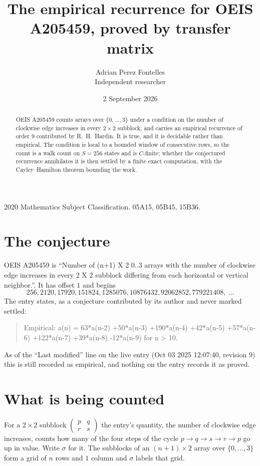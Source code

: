 \documentclass[11pt,a4paper]{article}
\title{The empirical recurrence for OEIS A205459, proved by transfer matrix}
\author{Adrian Perez Fontelles\\ \small Independent researcher}
\date{2 September 2026}
\theoremstyle{plain}
\theoremstyle{definition}
\begin{document}
\maketitle

\begin{abstract}
OEIS A205459 counts arrays over $\{0,\dots,3\}$ under a condition on the number of clockwise edge increases
in every $2\times2$ subblock, and carries an empirical recurrence of order $9$ contributed by
R.~H.~Hardin. It is true, and it is decidable rather than empirical. The condition is local to
a bounded window of consecutive rows, so the count is a walk count on $S=256$ states and is
$C$-finite; whether the conjectured recurrence annihilates it is then settled by a finite exact
computation, with the Cayley--Hamilton theorem bounding the work.
\end{abstract}

\noindent\small 2020 Mathematics Subject Classification. 05A15, 05B45, 15B36.\normalsize

\section{The conjecture}

OEIS A205459 is ``Number of (n+1) X 2 0..3 arrays with the number of clockwise edge increases in every 2 X 2 subblock differing from each horizontal or vertical neighbor.''. It has offset $1$ and begins
\[
256, 2120, 17920, 151824, 1285076, 10876432, 92062852, 779221408,\ \dots
\]
The entry states, as a conjecture contributed by its author and never marked settled:
\begin{quote}
Empirical: a(n) = 63*a(n-2) +50*a(n-3) +190*a(n-4) +42*a(n-5) +57*a(n-6) +122*a(n-7) +39*a(n-8) -12*a(n-9) for n > 10.
\end{quote}
As of the ``Last modified'' line on the live entry (Oct 03 2025 12:07:40, revision 9) this is still
recorded as empirical, and nothing on the entry records it as proved.

\section{What is being counted}

For a $2\times2$ subblock $\begin{pmatrix}p&q\\r&s\end{pmatrix}$ the
entry's quantity, the number of clockwise edge increases, counts how many of the four steps of the cycle $p\to q\to s\to r\to p$ go up in value. Write $\sigma$ for it. The subblocks of an
$(n+1)\times2$ array over $\{0,\dots,3\}$ form a grid of $n$ rows and $1$
column and $\sigma$ labels that grid.
\end{document}
